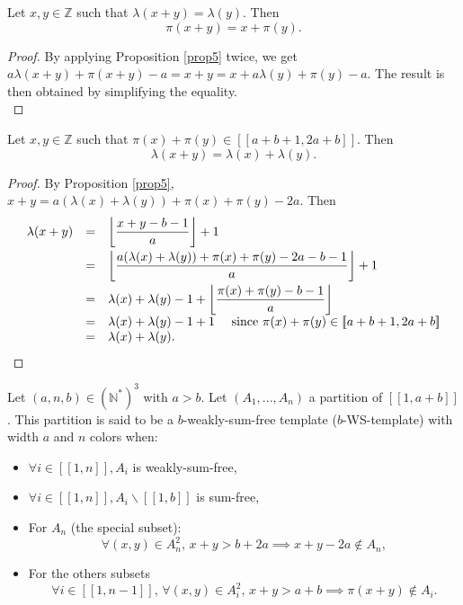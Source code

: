 \documentclass[final,onefignum,onetabnum]{siamart190516}
\begin{document}
\begin{proposition}
\label{prop6}
Let \(x, y \in \mathbb{Z}\) such that \(\lambda(x + y) = \lambda(y)\). Then
\[
\pi(x + y) = x + \pi(y).
\]
\end{proposition}

\begin{proof}
By applying Proposition \ref{prop5} twice, we get \(a \lambda(x + y) + \pi(x + y) - a = x + y = x + a \lambda(y) + \pi(y) - a\).
The result is then obtained by simplifying the equality. \\
\end{proof}

\begin{proposition}
\label{prop7}
Let \(x, y \in \mathbb{Z}\) such that \(\pi(x) + \pi(y) \in [\![a + b + 1, 2 a + b]\!]\). Then
\[
\lambda(x + y) = \lambda(x) + \lambda(y).
\]
\end{proposition}

\begin{proof}
By Proposition \ref{prop5}, \(x + y = a (\lambda(x) + \lambda(y)) + \pi(x) + \pi(y) - 2 a\). Then
\[
\begin{array}{l l l}
	\lambda(x + y) & = & \left \lfloor \dfrac{x + y - b - 1}{a} \right \rfloor + 1 \vspace{1mm} \\
	 & = & \left \lfloor \dfrac{a (\lambda(x) + \lambda(y)) + \pi(x) + \pi(y) - 2 a - b - 1}{a} \right \rfloor + 1 \vspace{1mm} \\
	 & = & \lambda(x) + \lambda(y) - 1 + \left \lfloor \dfrac{\pi(x) + \pi(y) - b - 1}{a}\right\rfloor \\
	 & = & \lambda(x)+\lambda(y) -1 +1 ~~~~\text{since } \pi(x) + \pi(y) \in [\![a + b + 1, 2 a + b]\!] \\
	 & =& \lambda(x)+\lambda(y).
\end{array}
\]
\end{proof}

\begin{definition}
Let \( (a,n,b) \in (\mathbb{N}^*)^3\) with \(a > b\). Let \((A_1,...,A_n)\) a partition of  \([\![1, a + b]\!]\).
This partition is said to be a \(b\)-weakly-sum-free template (\(b\)-WS-template) with width \(a\) and \(n\) colors when:

\begin{itemize}
\item \(\forall i \in [\![1, n]\!], A_i\) is weakly-sum-free,
\item \(\forall i \in [\![1, n]\!], A_i\backslash [\![1, b]\!]\) is sum-free,
\item For \(A_n\) (the special subset):
	\[
	\forall (x,y) \in A_n^2, \,x+y>b+2a \implies x+y-2a\notin A_n,
	\]
\item For the others subsets
	\[
	\forall i \in [\![1,n-1]\!], \, \forall(x,y) \in A_i^2, \, x+y>a+b \implies \pi(x+y) \notin A_i.
	\]
\end{itemize}
\end{definition}
\end{document}
